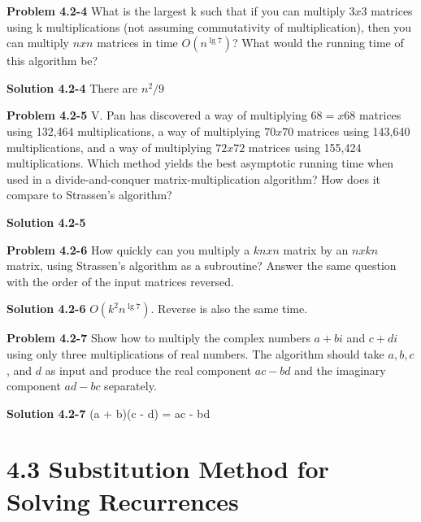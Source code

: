 \documentclass{article}
\begin{document}
\hrulefill

\medskip

\textbf{Problem 4.2-4} What is the largest k such that if you can multiply $3 x 3$ matrices using k multiplications (not assuming commutativity of multiplication), then you can multiply $n x n$ matrices in time $O(n^{\lg 7})$? What would the running time of this algorithm be?

\medskip

\textbf{Solution 4.2-4} There are $n^2/9$ 

\hrulefill

\medskip

\textbf{Problem 4.2-5} V. Pan has discovered a way of multiplying $68 = x 68$ matrices using 132,464 multiplications, a way of multiplying $70 x 70$ matrices using 143,640 multiplications, and a way of multiplying $72 x 72$ matrices using 155,424 multiplications. Which method yields the best asymptotic running time when used in a divide-and-conquer matrix-multiplication algorithm? How does it compare to Strassen’s algorithm?

\medskip

\textbf{Solution 4.2-5}

\hrulefill

\medskip

\textbf{Problem 4.2-6} How quickly can you multiply a $kn x n$ matrix by an $n x kn$ matrix, using Strassen’s algorithm as a subroutine? Answer the same question with the order of the input matrices reversed.

\medskip

\textbf{Solution 4.2-6} $O(k^2n^{\lg 7})$. Reverse is also the same time.

\hrulefill

\medskip

\textbf{Problem 4.2-7} Show how to multiply the complex numbers $a + bi$ and $c + di$ using only three multiplications of real numbers. The algorithm should take $a, b, c$, and $d$ as input and produce the real component $ac - bd$ and the imaginary component $ad - bc$ separately.

\medskip

\textbf{Solution 4.2-7} (a + b)(c - d) = ac - bd 

\hrulefill

\section*{4.3 Substitution Method for Solving Recurrences}
\end{document}
